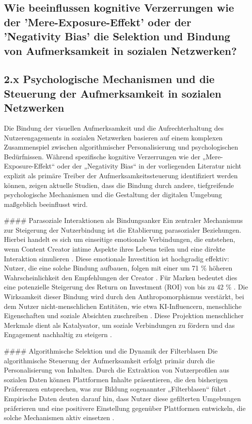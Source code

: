 \documentclass[11pt,a4paper]{article}
\begin{document}
\subsection{Wie beeinflussen kognitive Verzerrungen wie der 'Mere-Exposure-Effekt' oder der 'Negativity Bias' die Selektion und Bindung von Aufmerksamkeit in sozialen Netzwerken?}

\subsection{2.x Psychologische Mechanismen und die Steuerung der Aufmerksamkeit in sozialen Netzwerken}

Die Bindung der visuellen Aufmerksamkeit und die Aufrechterhaltung des Nutzerengagements in sozialen Netzwerken basieren auf einem komplexen Zusammenspiel zwischen algorithmischer Personalisierung und psychologischen Bedürfnissen. Während spezifische kognitive Verzerrungen wie der „Mere-Exposure-Effekt“ oder der „Negativity Bias“ in der vorliegenden Literatur nicht explizit als primäre Treiber der Aufmerksamkeitssteuerung identifiziert werden können, zeigen aktuelle Studien, dass die Bindung durch andere, tiefgreifende psychologische Mechanismen und die Gestaltung der digitalen Umgebung maßgeblich beeinflusst wird.

\#\#\#\# Parasoziale Interaktionen als Bindungsanker Ein zentraler Mechanismus zur Steigerung der Nutzerbindung ist die Etablierung parasozialer Beziehungen. Hierbei handelt es sich um einseitige emotionale Verbindungen, die entstehen, wenn Content Creator intime Aspekte ihres Lebens teilen und eine direkte Interaktion simulieren \autocite{grey_grey_5d5c282590c448fc8776b04f78a08de5}. Diese emotionale Investition ist hochgradig effektiv: Nutzer, die eine solche Bindung aufbauen, folgen mit einer um 71 \% höheren Wahrscheinlichkeit den Empfehlungen der Creator \autocite{grey_grey_5d5c282590c448fc8776b04f78a08de5}. Für Marken bedeutet dies eine potenzielle Steigerung des Return on Investment (ROI) von bis zu 42 \% \autocite{grey_grey_5d5c282590c448fc8776b04f78a08de5}. Die Wirksamkeit dieser Bindung wird durch den Anthropomorphismus verstärkt, bei dem Nutzer nicht-menschlichen Entitäten, wie etwa KI-Influencern, menschliche Eigenschaften und soziale Absichten zuschreiben \autocite{europepmc_42073973}. Diese Projektion menschlicher Merkmale dient als Katalysator, um soziale Verbindungen zu fördern und das Engagement nachhaltig zu steigern \autocite{europepmc_42073973}.

\#\#\#\# Algorithmische Selektion und die Dynamik der Filterblasen Die algorithmische Steuerung der Aufmerksamkeit erfolgt primär durch die Personalisierung von Inhalten. Durch die Extraktion von Nutzerprofilen aus sozialen Daten können Plattformen Inhalte präsentieren, die den bisherigen Präferenzen entsprechen, was zur Bildung sogenannter „Filterblasen“ führt \autocite{grey_grey_bbc8a51d8734471c850e8c2939fe8d32,crossref_10_22215_etd_2019_13484}. Empirische Daten deuten darauf hin, dass Nutzer diese gefilterten Umgebungen präferieren und eine positivere Einstellung gegenüber Plattformen entwickeln, die solche Mechanismen aktiv einsetzen \autocite{grey_grey_bbc8a51d8734471c850e8c2939fe8d32}.
\end{document}
